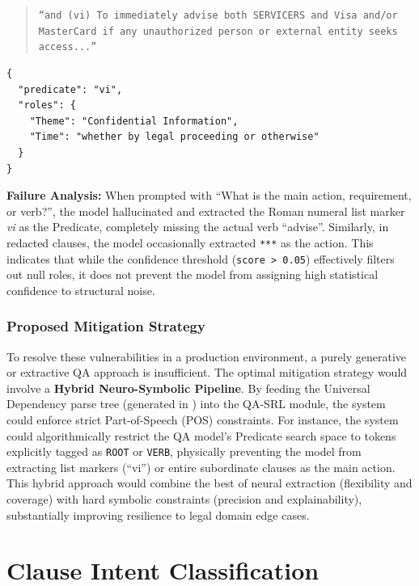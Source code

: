 \documentclass[twoside,final]{hcmut-report}
\newcommand{\result}[1]{\fcolorbox{red}{white}{#1}}
\begin{document}
\medskip

\begin{quote}
  \texttt{``and (vi) To immediately advise both SERVICERS and Visa and/or MasterCard if any unauthorized person or external entity seeks access...''}
\end{quote}

\begin{verbatim}
{
  "predicate": "vi",
  "roles": {
    "Theme": "Confidential Information",
    "Time": "whether by legal proceeding or otherwise"
  }
}
\end{verbatim}

\noindent
\textbf{Failure Analysis:} When prompted with ``What is the main action, requirement, or verb?'', the model hallucinated and extracted the Roman numeral list marker \emph{vi} as the Predicate, completely missing the actual verb ``advise''. Similarly, in redacted clauses, the model occasionally extracted \texttt{***} as the action. This indicates that while the confidence threshold (\texttt{score > 0.05}) effectively filters out null roles, it does not prevent the model from assigning high statistical confidence to structural noise.

\vspace{1em}
\subsubsection*{Proposed Mitigation Strategy}

To resolve these vulnerabilities in a production environment, a purely generative or extractive QA approach is insufficient. The optimal mitigation strategy would involve a \textbf{Hybrid Neuro-Symbolic Pipeline}. By feeding the Universal Dependency parse tree (generated in \result{Section~\ref{task_1.3}}) into the QA-SRL module, the system could enforce strict Part-of-Speech (POS) constraints. For instance, the system could algorithmically restrict the QA model's Predicate search space to tokens explicitly tagged as \texttt{ROOT} or \texttt{VERB}, physically preventing the model from extracting list markers (``vi'') or entire subordinate clauses as the main action. This hybrid approach would combine the best of neural extraction (flexibility and coverage) with hard symbolic constraints (precision and explainability), substantially improving resilience to legal domain edge cases.

\newpage\section{Clause Intent Classification}
\label{task_2.3}
\end{document}
